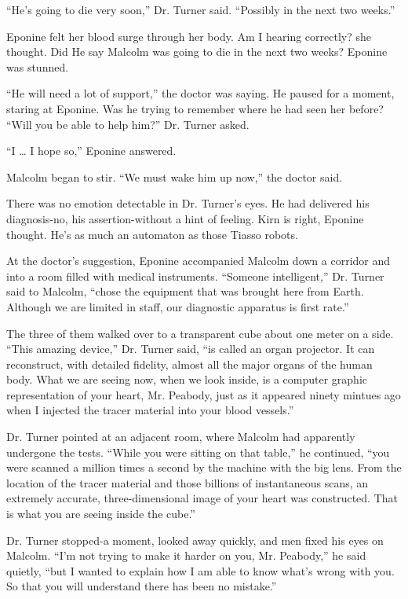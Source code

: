 \documentclass[]{article}
\begin{document}
{“He’s going to die very soon,” Dr.  Turner said.  “Possibly in the next two weeks.”

Eponine felt her blood surge through her body.  Am I hearing correctly? she thought.  Did He say Malcolm was going to die in the next two weeks? Eponine was stunned.

“He will need a lot of support,” the doctor was saying.  He paused for a moment, staring at Eponine.  Was he trying to remember where he had seen her before? “Will you be able to help him?” Dr.  Turner asked.

“I … I hope so,” Eponine answered.

Malcolm began to stir.  “We must wake him up now,” the doctor said.

There was no emotion detectable in Dr.  Turner’s eyes.  He had delivered his diagnosis-no, his assertion-without a hint of feeling.  Kirn is right, Eponine thought.  He’s as much an automaton as those Tiasso robots.

At the doctor’s suggestion, Eponine accompanied Malcolm down a corridor and into a room filled with medical instruments.  “Someone intelligent,” Dr.  Turner said to Malcolm, “chose the equipment that was brought here from Earth.  Although we are limited in staff, our diagnostic apparatus is first rate.”

The three of them walked over to a transparent cube about one meter on a side.  “This amazing device,” Dr.  Turner said, “is called an organ projector.  It can reconstruct, with detailed fidelity, almost all the major organs of the human body.  What we are seeing now, when we look inside, is a computer graphic representation of your heart, Mr.  Peabody, just as it appeared ninety mintues ago when I injected the tracer material into your blood vessels.”

Dr.  Turner pointed at an adjacent room, where Malcolm had apparently undergone the tests.  “While you were sitting on that table,” he continued, “you were scanned a million times a second by the machine with the big lens.  From the location of the tracer material and those billions of instantaneous scans, an extremely accurate, three-dimensional image of your heart was constructed.  That is what you are seeing inside the cube.”

Dr.  Turner stopped-a moment, looked away quickly, and men fixed his eyes on Malcolm.  “I’m not trying to make it harder on you, Mr.  Peabody,” he said quietly, “but I wanted to explain how I am able to know what’s wrong with you.  So that you will understand there has been no mistake.”

}
\end{document}
